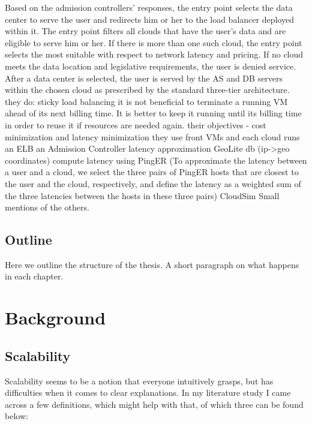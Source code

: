 \documentclass{uvamscse}
\begin{document}
Based on the admission controllers’ responses, the entry point selects the data center to serve the user and redirects him or her to the load balancer deployed within it. The entry point filters all clouds that have the user’s data and are eligible to serve him or her. If there is more than one such cloud, the entry point selects the most suitable with respect to network latency and pricing. If no cloud meets the data location and legislative requirements, the user is denied service.
After a data center is selected, the user is served by the AS and DB servers within the chosen cloud as prescribed by the standard three-tier architecture.
they do:
sticky load balancing
it is not beneficial to terminate a running VM ahead of its next billing time. It is better to keep it running until its billing time in order to reuse it if resources are needed again.
their objectives - cost minimization and latency minimization
they use front VMs and each cloud runs an ELB an Admission Controller
latency approximation
GeoLite db (ip->geo coordinates)
compute latency using PingER (To approximate the latency between a user and a cloud, we select the three pairs of PingER hosts that are closest to the user and the cloud, respectively, and define the latency as a weighted sum of the three latencies between the hosts in these three pairs)
CloudSim
Small mentions of the others.

\section{Outline}
Here we outline the structure of the thesis. A short paragraph on what happens in each chapter.


\chapter{Background}

\section{Scalability}

Scalability seems to be a notion that everyone intuitively grasps, but has difficulties when it comes to clear explanations. In my literature study I came across a few definitions, which might help with that, of which three can be found below:
\end{document}

